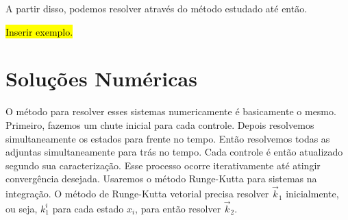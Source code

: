 A partir disso, podemos resolver através do método estudado até então. 

\begin{example}
    \hl{Inserir exemplo.}
\end{example}

\section{Soluções Numéricas}

O método para resolver esses sistemas numericamente é basicamente o mesmo.
Primeiro, fazemos um chute inicial para cada controle. Depois resolvemos
simultaneamente os estados para frente no tempo. Então resolvemos todas as
adjuntas simultaneamente para trás no tempo. Cada controle é então atualizado
segundo sua caracterização. Esse processo ocorre iterativamente até atingir
convergência desejada. Usaremos o método Runge-Kutta para sistemas na
integração. O método de Runge-Kutta vetorial precisa resolver $\vec{k}_1$
inicialmente, ou seja, $k_1^i$ para cada estado $x_i$, para então resolver
$\vec{k}_2$. 